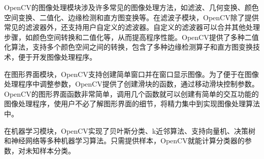 OpenCV的图像处理模块涉及许多常见的图像处理方法，如滤波、几何变换、颜色空间变换、二值化、边缘检测和直方图变换等。在滤波子模块，OpenCV除了提供常见的滤波器外，还支持用户自定义的滤波器。自定义的滤波器可以合并其他处理步骤，如颜色空间转换和二值化等，从而提高程序性能。OpenCV提供了多种二值化算法，支持多个颜色空间之间的转换，包含了多种边缘检测算子和直方图变换技术，便于开发图像处理程序。

在图形界面模块，OpenCV支持创建简单窗口并在窗口显示图像。为了便于在图像处理程序中调整参数，OpenCV提供了创建滑块的函数，通过移动滑块控制参数。OpenCV的图形界面函数非常简单，调用几个函数就可以创建有简单的交互功能的图像处理程序，使用户不必了解图形界面的细节，将精力集中到实现图像处理算法中。

在机器学习模块，OpenCV实现了贝叶斯分类、k近邻算法、支持向量机、决策树和神经网络等多种机器学习算法。只需提供样本，OpenCV就能计算分类器的参数，对未知样本分类。


